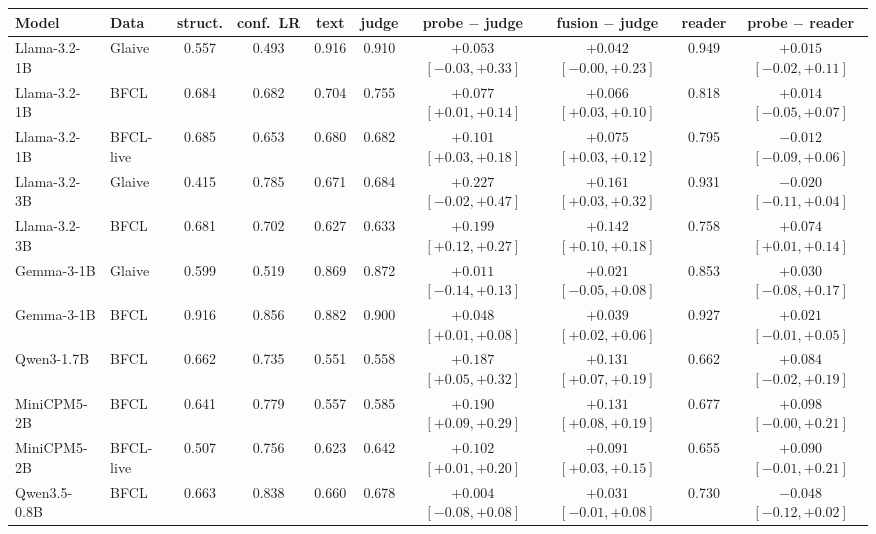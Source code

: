 \begin{tabular}{@{}llcccccccc@{}}
\toprule
Model & Data & struct. & conf.\ LR & text & judge & probe $-$ judge & fusion $-$ judge & reader & probe $-$ reader \\
\midrule
Llama-3.2-1B & Glaive & 0.557 & 0.493 & 0.916 & 0.910 & $+0.053$ {\scriptsize$[-0.03, +0.33]$} & $+0.042$ {\scriptsize$[-0.00, +0.23]$} & 0.949 & $+0.015$ {\scriptsize$[-0.02, +0.11]$} \\
Llama-3.2-1B & BFCL & 0.684 & 0.682 & 0.704 & 0.755 & $+0.077$ {\scriptsize$[+0.01, +0.14]$} & $+0.066$ {\scriptsize$[+0.03, +0.10]$} & 0.818 & $+0.014$ {\scriptsize$[-0.05, +0.07]$} \\
Llama-3.2-1B & BFCL-live & 0.685 & 0.653 & 0.680 & 0.682 & $+0.101$ {\scriptsize$[+0.03, +0.18]$} & $+0.075$ {\scriptsize$[+0.03, +0.12]$} & 0.795 & $-0.012$ {\scriptsize$[-0.09, +0.06]$} \\
Llama-3.2-3B & Glaive & 0.415 & 0.785 & 0.671 & 0.684 & $+0.227$ {\scriptsize$[-0.02, +0.47]$} & $+0.161$ {\scriptsize$[+0.03, +0.32]$} & 0.931 & $-0.020$ {\scriptsize$[-0.11, +0.04]$} \\
Llama-3.2-3B & BFCL & 0.681 & 0.702 & 0.627 & 0.633 & $+0.199$ {\scriptsize$[+0.12, +0.27]$} & $+0.142$ {\scriptsize$[+0.10, +0.18]$} & 0.758 & $+0.074$ {\scriptsize$[+0.01, +0.14]$} \\
Gemma-3-1B & Glaive & 0.599 & 0.519 & 0.869 & 0.872 & $+0.011$ {\scriptsize$[-0.14, +0.13]$} & $+0.021$ {\scriptsize$[-0.05, +0.08]$} & 0.853 & $+0.030$ {\scriptsize$[-0.08, +0.17]$} \\
Gemma-3-1B & BFCL & 0.916 & 0.856 & 0.882 & 0.900 & $+0.048$ {\scriptsize$[+0.01, +0.08]$} & $+0.039$ {\scriptsize$[+0.02, +0.06]$} & 0.927 & $+0.021$ {\scriptsize$[-0.01, +0.05]$} \\
Qwen3-1.7B & BFCL & 0.662 & 0.735 & 0.551 & 0.558 & $+0.187$ {\scriptsize$[+0.05, +0.32]$} & $+0.131$ {\scriptsize$[+0.07, +0.19]$} & 0.662 & $+0.084$ {\scriptsize$[-0.02, +0.19]$} \\
MiniCPM5-2B & BFCL & 0.641 & 0.779 & 0.557 & 0.585 & $+0.190$ {\scriptsize$[+0.09, +0.29]$} & $+0.131$ {\scriptsize$[+0.08, +0.19]$} & 0.677 & $+0.098$ {\scriptsize$[-0.00, +0.21]$} \\
MiniCPM5-2B & BFCL-live & 0.507 & 0.756 & 0.623 & 0.642 & $+0.102$ {\scriptsize$[+0.01, +0.20]$} & $+0.091$ {\scriptsize$[+0.03, +0.15]$} & 0.655 & $+0.090$ {\scriptsize$[-0.01, +0.21]$} \\
Qwen3.5-0.8B & BFCL & 0.663 & 0.838 & 0.660 & 0.678 & $+0.004$ {\scriptsize$[-0.08, +0.08]$} & $+0.031$ {\scriptsize$[-0.01, +0.08]$} & 0.730 & $-0.048$ {\scriptsize$[-0.12, +0.02]$} \\
\bottomrule
\end{tabular}
